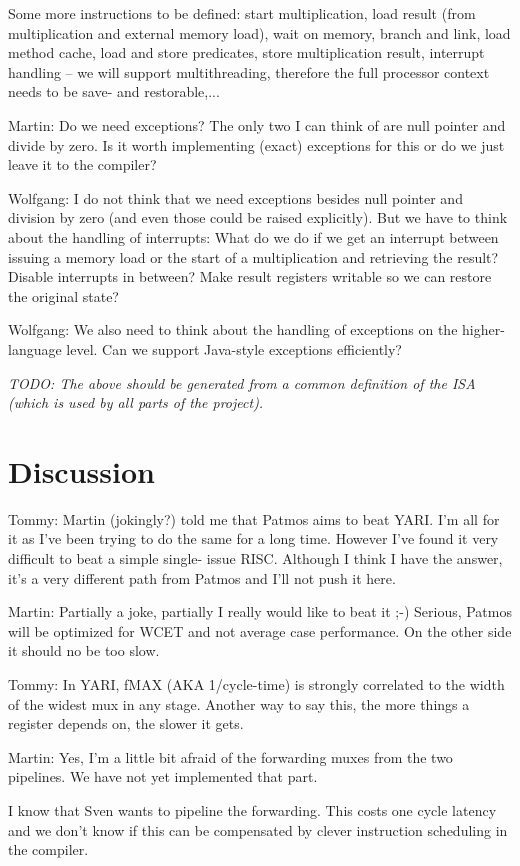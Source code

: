 \documentclass{IEEEtran}
\newcommand{\todo}[1]{{\emph{TODO: #1}}}
\newcommand{\tommy}[1]{{\color{red} Tommy: #1}}
\newcommand{\wolf}[1]{{\color{OliveGreen} Wolfgang: #1}}
\newcommand{\martin}[1]{{\color{blue} Martin: #1}}
\begin{document}
Some more instructions to be defined: start multiplication, load result (from multiplication and external memory load), wait on memory, branch and link, load method cache, load and store predicates, store multiplication result, interrupt handling -- we will support multithreading, therefore the full processor context needs to be save- and restorable,...

\martin{Do we need exceptions? The only two I can think of are null pointer and divide by zero. Is it worth implementing (exact) exceptions for this or do we just leave it to the compiler?}

\wolf{I do not think that we need exceptions besides null pointer and division by zero (and even those could be raised explicitly). But we have to think about the handling of interrupts: What do we do if we get an interrupt between issuing a memory load or the start of a multiplication and retrieving the result? Disable interrupts in between? Make result registers writable so we can restore the original state?}

\wolf{We also need to think about the handling of exceptions on the higher-language level. Can we support Java-style exceptions efficiently?}

\todo{The above should be generated from a common definition of the ISA (which is used by all parts of the project).}

\section{Discussion}


\tommy{Martin (jokingly?) told me that Patmos aims to
beat YARI. I'm all for it as I've been trying to do the same for a long
time. However I've found it very difficult to beat a simple single-
issue RISC. Although I think I have the answer, it's a very
different path from Patmos and I'll not push it here.}

\martin{Partially a joke, partially I really would like to beat it ;-)
Serious, Patmos will be optimized for WCET and not average
case performance. On the other side it should no be too slow.}

\tommy{In YARI, fMAX (AKA 1/cycle-time) is strongly correlated to the
 width of the widest mux in any stage. Another way to say this,
 the more things a register depends on, the slower it gets.}
 
\martin{Yes, I'm a little bit afraid of the forwarding muxes from the
two pipelines. We have not yet implemented that part.

I know that Sven wants to pipeline the forwarding. This
costs one cycle latency and we don't know if this can be
compensated by clever instruction scheduling in the
compiler.}
\end{document}
